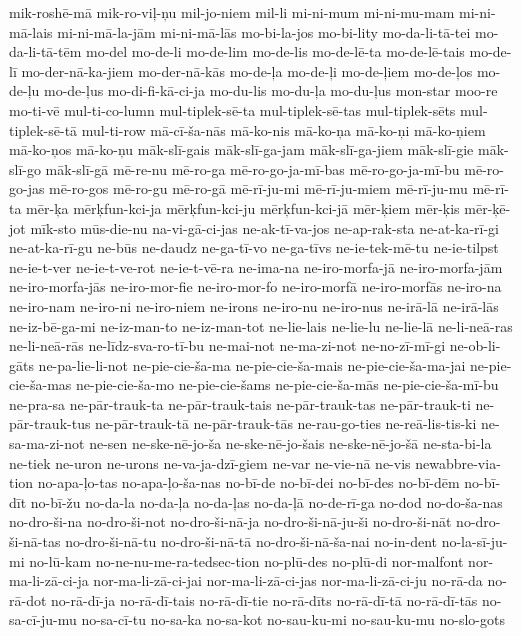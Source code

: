 {mik-roshē-mā
mik-ro-viļ-ņu
mil-jo-niem
mil-li
mi-ni-mum
mi-ni-mu-mam
mi-ni-mā-lais
mi-ni-mā-la-jām
mi-ni-mā-lās
mo-bi-la-jos
mo-bi-lity
mo-da-li-tā-tei
mo-da-li-tā-tēm
mo-del
mo-de-li
mo-de-lim
mo-de-lis
mo-de-lē-ta
mo-de-lē-tais
mo-de-lī
mo-der-nā-ka-jiem
mo-der-nā-kās
mo-de-ļa
mo-de-ļi
mo-de-ļiem
mo-de-ļos
mo-de-ļu
mo-de-ļus
mo-di-fi-kā-ci-ja
mo-du-lis
mo-du-ļa
mo-du-ļus
mon-star
moo-re
mo-ti-vē
mul-ti-co-lumn
mul-tiplek-sē-ta
mul-tiplek-sē-tas
mul-tiplek-sēts
mul-tiplek-sē-tā
mul-ti-row
mā-cī-ša-nās
mā-ko-nis
mā-ko-ņa
mā-ko-ņi
mā-ko-ņiem
mā-ko-ņos
mā-ko-ņu
māk-slī-gais
māk-slī-ga-jam
māk-slī-ga-jiem
māk-slī-gie
māk-slī-go
māk-slī-gā
mē-re-nu
mē-ro-ga
mē-ro-go-ja-mī-bas
mē-ro-go-ja-mī-bu
mē-ro-go-jas
mē-ro-gos
mē-ro-gu
mē-ro-gā
mē-rī-ju-mi
mē-rī-ju-miem
mē-rī-ju-mu
mē-rī-ta
mēr-ķa
mērķfun-kci-ja
mērķfun-kci-ju
mērķfun-kci-jā
mēr-ķiem
mēr-ķis
mēr-ķē-jot
mīk-sto
mūs-die-nu
na-vi-gā-ci-jas
ne-ak-tī-va-jos
ne-ap-rak-sta
ne-at-ka-rī-gi
ne-at-ka-rī-gu
ne-būs
ne-daudz
ne-ga-tī-vo
ne-ga-tīvs
ne-ie-tek-mē-tu
ne-ie-tilpst
ne-ie-t-ver
ne-ie-t-ve-rot
ne-ie-t-vē-ra
ne-ima-na
ne-iro-morfa-jā
ne-iro-morfa-jām
ne-iro-morfa-jās
ne-iro-mor-fie
ne-iro-mor-fo
ne-iro-morfā
ne-iro-morfās
ne-iro-na
ne-iro-nam
ne-iro-ni
ne-iro-niem
ne-irons
ne-iro-nu
ne-iro-nus
ne-irā-lā
ne-irā-lās
ne-iz-bē-ga-mi
ne-iz-man-to
ne-iz-man-tot
ne-lie-lais
ne-lie-lu
ne-lie-lā
ne-li-neā-ras
ne-li-neā-rās
ne-līdz-sva-ro-tī-bu
ne-mai-not
ne-ma-zi-not
ne-no-zī-mī-gi
ne-ob-li-gāts
ne-pa-lie-li-not
ne-pie-cie-ša-ma
ne-pie-cie-ša-mais
ne-pie-cie-ša-ma-jai
ne-pie-cie-ša-mas
ne-pie-cie-ša-mo
ne-pie-cie-šams
ne-pie-cie-ša-mās
ne-pie-cie-ša-mī-bu
ne-pra-sa
ne-pār-trauk-ta
ne-pār-trauk-tais
ne-pār-trauk-tas
ne-pār-trauk-ti
ne-pār-trauk-tus
ne-pār-trauk-tā
ne-pār-trauk-tās
ne-rau-go-ties
ne-reā-lis-tis-ki
ne-sa-ma-zi-not
ne-sen
ne-ske-nē-jo-ša
ne-ske-nē-jo-šais
ne-ske-nē-jo-šā
ne-sta-bi-la
ne-tiek
ne-uron
ne-urons
ne-va-ja-dzī-giem
ne-var
ne-vie-nā
ne-vis
newabbre-via-tion
no-apa-ļo-tas
no-apa-ļo-ša-nas
no-bī-de
no-bī-dei
no-bī-des
no-bī-dēm
no-bī-dīt
no-bī-žu
no-da-la
no-da-ļa
no-da-ļas
no-da-ļā
no-de-rī-ga
no-dod
no-do-ša-nas
no-dro-ši-na
no-dro-ši-not
no-dro-ši-nā-ja
no-dro-ši-nā-ju-ši
no-dro-ši-nāt
no-dro-ši-nā-tas
no-dro-ši-nā-tu
no-dro-ši-nā-tā
no-dro-ši-nā-ša-nai
no-in-dent
no-la-sī-ju-mi
no-lū-kam
no-ne-nu-me-ra-tedsec-tion
no-plū-des
no-plū-di
nor-malfont
nor-ma-li-zā-ci-ja
nor-ma-li-zā-ci-jai
nor-ma-li-zā-ci-jas
nor-ma-li-zā-ci-ju
no-rā-da
no-rā-dot
no-rā-dī-ja
no-rā-dī-tais
no-rā-dī-tie
no-rā-dīts
no-rā-dī-tā
no-rā-dī-tās
no-sa-cī-ju-mu
no-sa-cī-tu
no-sa-ka
no-sa-kot
no-sau-ku-mi
no-sau-ku-mu
no-slo-gots
}
